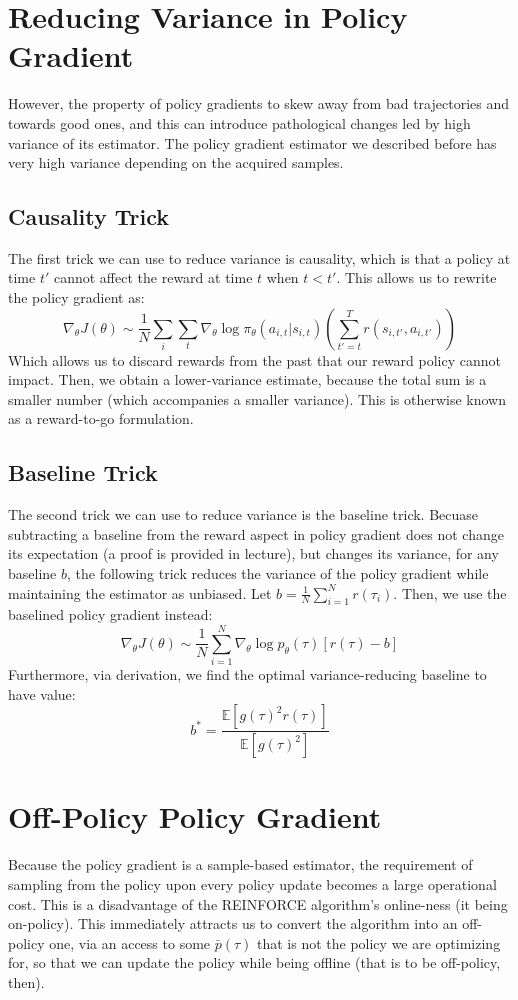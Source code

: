 \section{Reducing Variance in Policy Gradient}
However, the property of policy gradients to skew away from bad trajectories and towards good ones, and this can introduce pathological changes led by high variance of its estimator.
The policy gradient estimator we described before has very high variance depending on the acquired samples.

\subsection{Causality Trick}
The first trick we can use to reduce variance is causality, which is that a policy at time $t'$ cannot affect the reward at time $t$ when $t < t'$.
This allows us to rewrite the policy gradient as:
\[
    \nabla_\theta J(\theta) \sim \frac{1}{N} \sum_i \sum_t \nabla_\theta \log \pi_\theta(a_{i,t} | s_{i,t}) \left( \sum_{t'=t}^T r(s_{i,t'}, a_{i,t'}) \right)
\]
Which allows us to discard rewards from the past that our reward policy cannot impact.
Then, we obtain a lower-variance estimate, because the total sum is a smaller number (which accompanies a smaller variance).
This is otherwise known as a reward-to-go formulation.

\subsection{Baseline Trick}
The second trick we can use to reduce variance is the baseline trick.
Becuase subtracting a baseline from the reward aspect in policy gradient does not change its expectation (a proof is provided in lecture), but changes its variance, for any baseline $b$, the following trick reduces the variance of the policy gradient while maintaining the estimator as unbiased.
Let $b = \frac{1}{N} \sum_{i=1}^N r(\tau_i)$. Then, we use the baselined policy gradient instead:
\[
    \nabla_\theta J(\theta) \sim \frac{1}{N} \sum_{i=1}^N \nabla_\theta \log p_\theta (\tau) [r(\tau) - b]
\]
Furthermore, via derivation, we find the optimal variance-reducing baseline to have value:
\[
    b^* = \frac{\mathbb{E} [{g(\tau)}^2 r(\tau)]}{\mathbb{E} [{g(\tau)}^2]}
\]

\section{Off-Policy Policy Gradient}
Because the policy gradient is a sample-based estimator, the requirement of sampling from the policy upon every policy update becomes a large operational cost.
This is a disadvantage of the REINFORCE algorithm's online-ness (it being on-policy).
This immediately attracts us to convert the algorithm into an off-policy one, via an access to some $\bar{p}(\tau)$ that is not the policy we are optimizing for, so that we can update the policy while being offline (that is to be off-policy, then).

